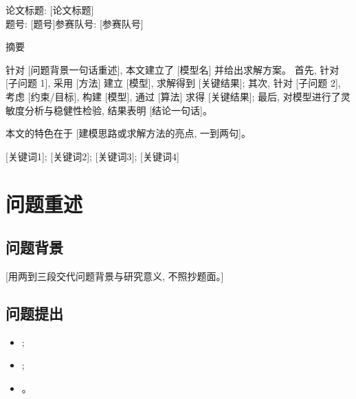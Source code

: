\documentclass[zihao=-4,a4paper]{ctexart}
\begin{document}


\begin{center}
  {\Large\heiti 论文标题: [论文标题]}\\[0.3em]
  {\large 题号: [题号]\qquad 参赛队号: [参赛队号]}
\end{center}

\vspace{0.5em}

\begin{center}
  {\Large\heiti 摘\quad 要}
\end{center}

针对 [问题背景一句话重述], 本文建立了 [模型名] 并给出求解方案。
首先, 针对 [子问题 1], 采用 [方法] 建立 [模型], 求解得到 [关键结果];
其次, 针对 [子问题 2], 考虑 [约束/目标], 构建 [模型], 通过 [算法] 求得
[关键结果]; 最后, 对模型进行了灵敏度分析与稳健性检验, 结果表明
[结论一句话]。

本文的特色在于 [建模思路或求解方法的亮点, 一到两句]。

\vspace{1em}
 [关键词1]; [关键词2]; [关键词3]; [关键词4]

\newpage


\section{问题重述}

\subsection{问题背景}

[用两到三段交代问题背景与研究意义, 不照抄题面。]

\subsection{问题提出}

\begin{itemize}
  \item [子问题 1 的任务描述];
  \item [子问题 2 的任务描述];
  \item [子问题 3 的任务描述]。
\end{itemize}
\end{document}
